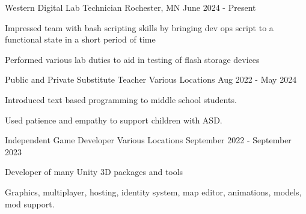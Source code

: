 

\begin{cventries}

  \cventry
    {Western Digital} %
    {Lab Technician} %
    {Rochester, MN} %
    {June 2024 - Present} %
    {
      \begin{cvitems} %
        \item {Impressed team with bash scripting skills by bringing dev ops script to a functional state in a short period of time}
        \item {Performed various lab duties to aid in testing of flash storage devices}
      \end{cvitems}
    }

  \cventry
    {Public and Private} %
    {Substitute Teacher} %
    {Various Locations} %
    {Aug 2022 - May 2024} %
    {
      \begin{cvitems} %
        \item {Introduced text based programming to middle school students.}
        \item {Used patience and empathy to support children with ASD.}
      \end{cvitems}
    }

  \cventry
    {Independent} %
    {Game Developer} %
    {Various Locations} %
    {September 2022 - September 2023} %
    {
      \begin{cvitems} %
        \item {Developer of many Unity 3D packages and tools}
        \item {Graphics, multiplayer, hosting, identity system, map editor, animations, models, mod support.}
      \end{cvitems}
    }


\end{cventries}
